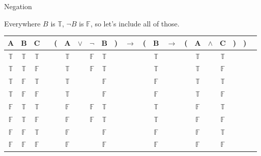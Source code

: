 \documentclass[
  ignorenonframetext,
]{beamer}
\renewcommand{\,}{\text{, }}
\def\True{\mathbb{T}}
\def\False{\mathbb{F}}
\begin{document}
\begin{frame}{Negation}
\protect\hypertarget{negation}{}

Everywhere \(B\) is \(\True\), \(\neg B\) is \(\False\), so let's
include all of those.

\begin{center}
\bigskip
\begin{tabular}{@{ }c@{ }@{ }c@{ }@{ }c | c@{ }@{}c@{}@{ }c@{ }@{ }c@{ }@{ }c@{ }@{ }c@{ }@{}c@{}@{ }c@{ }@{}c@{}@{ }c@{ }@{ }c@{ }@{}c@{}@{ }c@{ }@{ }c@{ }@{ }c@{ }@{}c@{}@{}c@{}@{ }c}
A & B & C &  & ( & A & $\vee$ & $\neg$ & B & ) & $\rightarrow$ & ( & B & $\rightarrow$ & ( & A & $\wedge$ & C & ) & ) & \\
\hline 
 $\True$ & $\True$ & $\True$ &  &  & $\True$ && $\False$ & $\True$ &  &&  & $\True$ &&  & $\True$ && $\True$ &  &  & \\
 $\True$ & $\True$ & $\False$ &  &  & $\True$ && $\False$ & $\True$ &  &&  & $\True$ &&  & $\True$ && $\False$ &  &  & \\
 $\True$ & $\False$ & $\True$ &  &  & $\True$ &&& $\False$ &  &&  & $\False$ &&  & $\True$ && $\True$ &  &  & \\
 $\True$ & $\False$ & $\False$ &  &  & $\True$ &&& $\False$ &  &&  & $\False$ &&  & $\True$ && $\False$ &  &  & \\
 $\False$ & $\True$ & $\True$ &  &  & $\False$ && $\False$ & $\True$ &  &&  & $\True$ &&  & $\False$ && $\True$ &  &  & \\
 $\False$ & $\True$ & $\False$ &  &  & $\False$ && $\False$ & $\True$ &  &&  & $\True$ &&  & $\False$ && $\False$ &  &  & \\
 $\False$ & $\False$ & $\True$ &  &  & $\False$ &&& $\False$ &  &&  & $\False$ &&  & $\False$ && $\True$ &  &  & \\
 $\False$ & $\False$ & $\False$ &  &  & $\False$ &&& $\False$ &  &&  & $\False$ &&  & $\False$ && $\False$ &  &  & \\
\end{tabular}
\bigskip
\end{center}

\end{frame}
\end{document}
